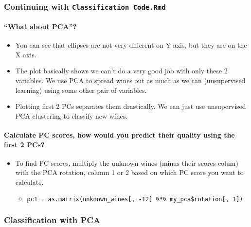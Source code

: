 \documentclass[]{article}
\providecommand{\tightlist}{%
  \setlength{\itemsep}{0pt}\setlength{\parskip}{0pt}}
\let\oldparagraph\paragraph
\renewcommand{\paragraph}[1]{\oldparagraph{#1}\mbox{}}
\begin{document}
\hypertarget{continuing-with-classification-code.rmd}{%
\subsubsection{\texorpdfstring{Continuing with
\texttt{Classification\ Code.Rmd}}{Continuing with Classification Code.Rmd}}\label{continuing-with-classification-code.rmd}}

\hypertarget{what-about-pca}{%
\paragraph{``What about PCA''?}\label{what-about-pca}}

\begin{itemize}
\tightlist
\item
  You can see that ellipses are not very different on Y axis, but they
  are on the X axis.
\item
  The plot basically shows we can't do a very good job with only these 2
  variables. We use PCA to spread wines out as much as we can
  (unsupervised learning) using some other pair of variables.
\item
  Plotting first 2 PCs separates them drastically. We can just use
  unsupervised PCA clustering to classify new wines.
\end{itemize}

\hypertarget{calculate-pc-scores-how-would-you-predict-their-quality-using-the-first-2-pcs}{%
\paragraph{Calculate PC scores, how would you predict their quality
using the first 2
PCs?}\label{calculate-pc-scores-how-would-you-predict-their-quality-using-the-first-2-pcs}}

\begin{itemize}
\tightlist
\item
  To find PC scores, multiply the unknown wines (minus their scores
  colum) with the PCA rotation, column 1 or 2 based on which PC score
  you want to calculate.

  \begin{itemize}
  \tightlist
  \item
    \texttt{pc1\ =\ as.matrix(unknown\_wines{[},\ -12{]}\ \%*\%\ my\_pca\$rotation{[},\ 1{]})}
  \end{itemize}
\end{itemize}

\hypertarget{classification-with-pca}{%
\subsubsection{Classification with PCA}\label{classification-with-pca}}
\end{document}
